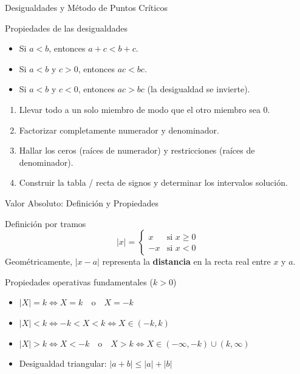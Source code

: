 \documentclass[aspectratio=169]{beamer}
\begin{document}
\begin{frame}{Desigualdades y Método de Puntos Críticos}
  \begin{block}{Propiedades de las desigualdades}
    \begin{itemize}
      \item Si $a < b$, entonces $a + c < b + c$.
      \item Si $a < b$ y $c > 0$, entonces $ac < bc$.
      \item Si $a < b$ y \alert{$c < 0$}, entonces \alert{$ac > bc$} (la desigualdad se invierte).
    \end{itemize}
  \end{block}

  \vspace{4pt}
  \begin{mwpasos}
    \begin{enumerate}
      \item Llevar todo a un solo miembro de modo que el otro miembro sea 0.
      \item Factorizar completamente numerador y denominador.
      \item Hallar los ceros (raíces de numerador) y restricciones (raíces de denominador).
      \item Construir la tabla / recta de signos y determinar los intervalos solución.
    \end{enumerate}
  \end{mwpasos}
\end{frame}

\begin{frame}{Valor Absoluto: Definición y Propiedades}
  \begin{block}{Definición por tramos}
    $$|x| = \begin{cases} x & \text{si } x \ge 0 \\ -x & \text{si } x < 0 \end{cases}$$
    Geométricamente, $|x - a|$ representa la \textbf{distancia} en la recta real entre $x$ y $a$.
  \end{block}

  \vspace{4pt}
  \begin{block}{Propiedades operativas fundamentales ($k > 0$)}
    \begin{itemize}
      \item $|X| = k \iff X = k \quad\text{o}\quad X = -k$
      \item $|X| < k \iff -k < X < k \iff X \in (-k, k)$
      \item $|X| > k \iff X < -k \quad\text{o}\quad X > k \iff X \in (-\infty, -k) \cup (k, \infty)$
      \item Desigualdad triangular: $|a + b| \le |a| + |b|$
    \end{itemize}
  \end{block}
\end{frame}
\end{document}
